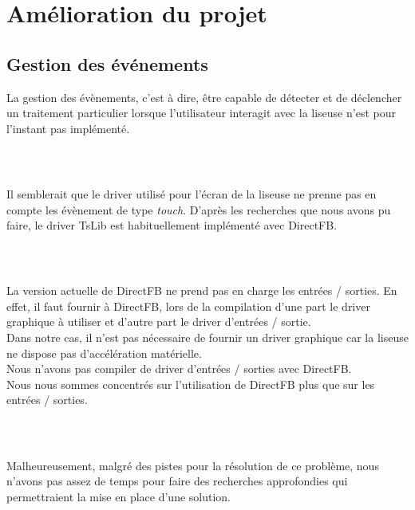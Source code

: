 \chapter{Amélioration du projet}





\section{Gestion des événements}
La gestion des évènements, c'est à dire, être capable de détecter et de déclencher un traitement particulier lorsque l'utilisateur interagit avec la liseuse n'est pour l'instant pas implémenté.
\paragraph*{~}
Il semblerait que le driver utilisé pour l'écran de la liseuse ne prenne pas en compte les évènement de type \emph{touch}. D'après les recherches que nous avons pu faire, le driver TsLib est habituellement implémenté avec DirectFB.
\paragraph*{~}
La version actuelle de DirectFB ne prend pas en charge les entrées / sorties. En effet, il faut fournir à DirectFB, lors de la compilation d'une part le driver graphique à utiliser et d'autre part le driver d'entrées / sortie.\\Dans notre cas, il n'est pas nécessaire de fournir un driver graphique car la liseuse ne dispose pas d'accélération matérielle.\\Nous n'avons pas compiler de driver d'entrées / sorties avec DirectFB.\\Nous nous sommes concentrés sur l'utilisation de DirectFB plus que sur les entrées / sorties.
\paragraph*{~}
Malheureusement, malgré des pistes pour la résolution de ce problème, nous n'avons pas assez de temps pour faire des recherches approfondies qui permettraient la mise en place d'une solution.


